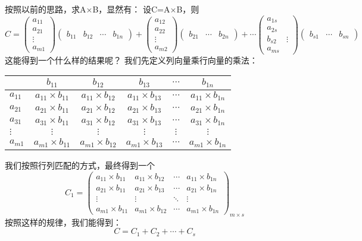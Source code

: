 \documentclass[12pt,a4paper]{book}
\begin{document}
按照以前的思路，求A$\times$B，显然有：
设C=A$\times$B，则
\[
C=
\begin{pmatrix}
a_{11}\\
a_{21}\\
\vdots\\
a_{m1}
\end{pmatrix}
\begin{pmatrix}
b_{11} & b_{12} & \cdots & b_{1n}
\end{pmatrix}
+
\begin{pmatrix}
a_{12}\\
a_{22}\\
\vdots\\
a_{m2}
\end{pmatrix}
\begin{pmatrix}
b_{21} &
\cdots &
b_{2n}
\end{pmatrix}
+\cdots
\begin{pmatrix}
a_{1s}\\
a_{2s}\\
b_{s2} &
\vdots\\
a_{ms}
\end{pmatrix}
\begin{pmatrix}
b_{s1} &
\cdots &
b_{sn}
\end{pmatrix}
\]
这能得到一个什么样的结果呢？
我们先定义列向量乘行向量的乘法：
\begin{center}
\begin{tabular}{|l|c|c|c|c|c|}
\hline
\textbf{} & \textbf{$b_{11}$} & \textbf{$b_{12}$} & \textbf{$b_{13}$} & \textbf{$\cdots$} & \textbf{$b_{1n}$} \\
\hline
$a_{11}$ & $a_{11} \times b_{11}$ & $a_{11} \times b_{12}$ & $a_{11} \times b_{13}$ & $\cdots$ & $a_{11} \times b_{1n}$ \\
$a_{21}$ & $a_{21} \times b_{11}$ & $a_{21} \times b_{12}$ & $a_{21} \times b_{13}$ & $\cdots$ & $a_{21} \times b_{1n}$ \\
$a_{31}$ & $a_{31} \times b_{11}$ & $a_{31} \times b_{12}$ & $a_{31} \times b_{13}$ & $\cdots$ & $a_{31} \times b_{1n}$ \\
$\vdots$ & $\vdots$ & $\vdots$ & $\vdots$ & $\vdots$ & $\vdots$ \\
$a_{m1}$ & $a_{m1} \times b_{11}$ & $a_{m1} \times b_{12}$ & $a_{m1} \times b_{13}$ & $\cdots$ & $a_{m1} \times b_{1n}$ \\
\hline
\end{tabular}
\end{center}
我们按照行列匹配的方式，最终得到一个
\[
C_{1}=\begin{pmatrix}
a_{11} \times b_{11} & a_{11} \times b_{12} & \cdots & a_{11} \times b_{1n} \\
a_{21} \times b_{11} & a_{21} \times b_{13} & \cdots & a_{21} \times b_{1n} \\
\vdots & \vdots & \ddots & \vdots\\
a_{m1} \times b_{11} & a_{m1} \times b_{12} & \cdots & a_{m1} \times b_{1n}
\end{pmatrix}_{m\times s}
\]
按照这样的规律，我们能得到：
\[C=C_1+C_2+\cdots+C_s\]
\end{document}
